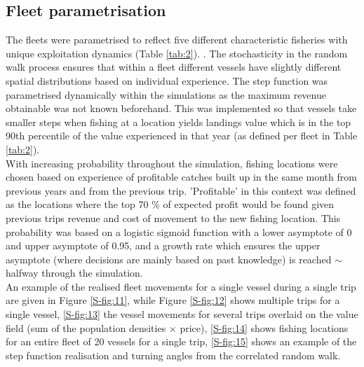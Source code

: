 \documentclass[review]{elsarticle}
\begin{document}
\subsection{Fleet parametrisation}

The fleets were parametrised to reflect five different characteristic fisheries
with unique exploitation dynamics (Table \ref{tab:2}).  .  The
stochasticity in the random walk process ensures that within a fleet different
vessels have slightly different spatial distributions based on individual
experience. The step function was parametrised dynamically within the
simulations as the maximum revenue obtainable was not known beforehand. This
was implemented so that vessels take smaller steps when fishing at a location
yields landings value which is in the top 90th percentile of the value
experienced in that year (as defined per fleet in Table \ref{tab:2}). \\

With increasing probability throughout the simulation, fishing locations were
chosen based on experience of profitable catches built up in the same month
from previous years and from the previous trip. 'Profitable' in this context
was defined as the locations where the top 70 \% of expected profit would be
found given previous trips revenue and cost of movement to the new fishing
location.  This probability was based on a logistic sigmoid function with a
lower asymptote of 0 and upper asymptote of 0.95, and a growth rate which
ensures the upper asymptote (where decisions are mainly based on past
knowledge) is reached $\sim$ halfway through the simulation.  \\

An example of the realised fleet movements for a single vessel during a single
trip are given in Figure \ref{S-fig:11}, while Figure \ref{S-fig:12} shows
multiple trips for a single vessel,  \ref{S-fig:13} the
vessel movements for several trips overlaid on the value field (sum of the
population densities $\times$ price),  \ref{S-fig:14} shows
fishing locations for an entire fleet of 20 vessels for a single trip,
 \ref{S-fig:15} shows an example of the step
function realisation and turning angles from the correlated random
walk.
\end{document}
